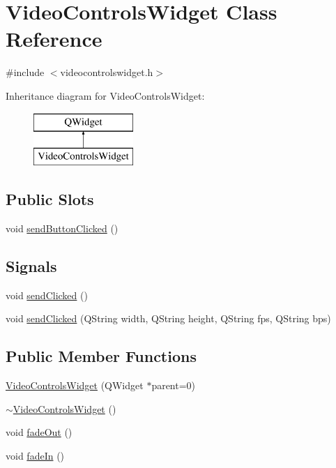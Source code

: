 \hypertarget{classVideoControlsWidget}{\section{Video\-Controls\-Widget Class Reference}
\label{classVideoControlsWidget}
}


{\ttfamily \#include $<$videocontrolswidget.\-h$>$}

Inheritance diagram for Video\-Controls\-Widget\-:\begin{figure}[H]
\begin{center}
\leavevmode
\includegraphics[height=2.000000cm]{classVideoControlsWidget}
\end{center}
\end{figure}
\subsection*{Public Slots}
\begin{DoxyCompactItemize}
\item 
void \hyperlink{classVideoControlsWidget_aff63e3d97d541cf8c05d53dd32e26292}{send\-Button\-Clicked} ()
\end{DoxyCompactItemize}
\subsection*{Signals}
\begin{DoxyCompactItemize}
\item 
void \hyperlink{classVideoControlsWidget_a5d85d6628fdb2016d49228bffb569679}{send\-Clicked} ()
\item 
void \hyperlink{classVideoControlsWidget_a9c0561d628dd239a37d1a0d52ce3a475}{send\-Clicked} (Q\-String width, Q\-String height, Q\-String fps, Q\-String bps)
\end{DoxyCompactItemize}
\subsection*{Public Member Functions}
\begin{DoxyCompactItemize}
\item 
\hyperlink{classVideoControlsWidget_ac0873fb8672cefc5f6549cac23e57757}{Video\-Controls\-Widget} (Q\-Widget $\ast$parent=0)
\item 
\hyperlink{classVideoControlsWidget_a6b85a92f3e656f11f48cdc580c2b4e0a}{$\sim$\-Video\-Controls\-Widget} ()
\item 
void \hyperlink{classVideoControlsWidget_aa7a0e5cf6d96db502d1826ec9ed43afa}{fade\-Out} ()
\item 
void \hyperlink{classVideoControlsWidget_a6fee9a987ad66923a326754e227019cc}{fade\-In} ()
\end{DoxyCompactItemize}
